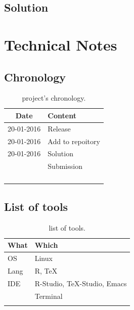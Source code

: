 \documentclass[a4paper,12pt,titlepage]{article} %
\begin{document}
\subsection{Solution}

\newpage
\section{Technical Notes}

\subsection{Chronology}
\begin{longtable}{|c|p{13cm}|}
	\hline
	Date & Content\\
	\hline
	20-01-2016 & Release\\
	\hline
	20-01-2016 & Add to repoitory\\
	\hline
	20-01-2016 & Solution\\
	\hline
	& Submission\\
	\hline
	& \\
	\hline
	& \\
	\hline
	& \\
	\hline
	\caption{project's chronology.}
\end{longtable}

\subsection{List of tools}
\begin{table}[h]
	\begin{tabularx}{\textwidth}{|l|X|}
		\hline
		What & Which \\
		\hline
		OS & Linux \\
		\hline
		Lang & R, \TeX \\
		\hline
		IDE & R-Studio, \TeX-Studio, Emacs\\
		\hline
		& Terminal\\
		\hline
		& \\
		\hline
	\end{tabularx}
	\caption{list of tools.}
\end{table}

\end{document}

